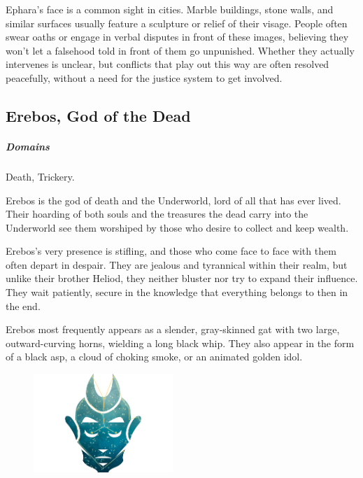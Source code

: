         Ephara's face is a common sight in cities.
        Marble buildings, stone walls, and similar surfaces usually feature a sculpture or relief of their visage.
        People often swear oaths or engage in verbal disputes in front of these images, believing they won't let a falsehood told in front of them go unpunished.
        Whether they actually intervenes is unclear, but conflicts that play out this way are often resolved peacefully, without a need for the justice system to get involved.

\pagebreak

\subsection*{Erebos, God of the Dead} \label{ssec::erebos}
    \subparagraph{Domains} Death, Trickery.

    Erebos is the god of death and the Underworld, lord of all that has ever lived.
    Their hoarding of both souls and the treasures the dead carry into the Underworld see them worshiped by those who desire to collect and keep wealth.

    Erebos's very presence is stifling, and those who come face to face with them often depart in despair.
    They are jealous and tyrannical within their realm, but unlike their brother Heliod, they neither bluster nor try to expand their influence.
    They wait patiently, secure in the knowledge that everything belongs to then in the end.

    Erebos most frequently appears as a slender, gray-skinned gat with two large, outward-curving horns, wielding a long black whip.
    They also appear in the form of a black asp, a cloud of choking smoke, or an animated golden idol.

    \begin{figure}[b]
        \centering
        \includegraphics[width=0.47\textwidth]{02viphoger/img/10s_erebos.png}
    \end{figure}

